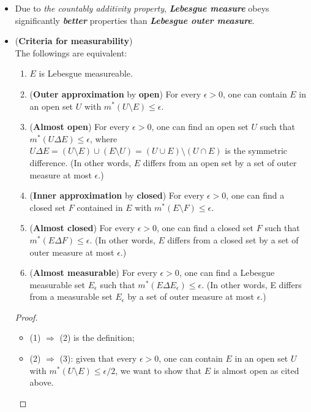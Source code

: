 \documentclass[11pt]{article}
\begin{document}
\begin{itemize}
\item \begin{remark}
Due to \emph{the countably additivity property}, \emph{\textbf{Lebesgue measure}} obeys significantly \emph{\textbf{better}} properties than \emph{\textbf{Lebesgue outer measure}}.
\end{remark}

\item \begin{proposition} (\textbf{Criteria for measurability})  \citep{tao2011introduction} \\
The followings are equivalent:
\begin{enumerate}
\item $E$ is Lebesgue measureable.
\item (\textbf{Outer approximation} by \textbf{open}) For every $\epsilon>0$, one can contain $E$ in an open set $U$ with $m^{*}(U \setminus  E)\le \epsilon $.
\item (\textbf{Almost open}) For every $\epsilon>0$, one can find an open set $U$ such that  $m^{*}(U\Delta E)\le \epsilon $, where $U\Delta E = (U  \setminus  E)\cup (E  \setminus  U) = (U\cup E) \setminus  (U\cap E)$ is the symmetric difference. (In other words, $E$ differs from an open set by a set of outer measure at most $\epsilon$.)
\item (\textbf{Inner approximation} by \textbf{closed}) For every $\epsilon>0$, one can find a closed set $F$ contained in $E$ with $m^{*}(E  \setminus  F)\le \epsilon $.
\item (\textbf{Almost closed}) For every $\epsilon>0$, one can find a closed set $F$ such that $m^{*}(E\Delta F)\le \epsilon $. (In other words, $E$ differs from a closed set by a set of outer measure at most $\epsilon$.)
\item (\textbf{Almost measurable}) For every $\epsilon>0$, one can find a Lebesgue measurable set $E_{\epsilon}$ such that $m^{*}(E\Delta E_{\epsilon})\le \epsilon $. (In other words, E differs from a measurable set $E_{\epsilon}$ by a set of outer measure at most $\epsilon$.)
\end{enumerate}
\end{proposition}
\begin{proof}
\begin{itemize}
\item (1) $\Rightarrow$ (2) is the definition;  
\item (2) $\Rightarrow$ (3): given that every $\epsilon>0$, one can contain $E$ in an open set $U$ with $m^{*}(U  \setminus  E)\le \epsilon/2 $, we want to show that $E$ is almost open as cited above. 


\end{itemize}
\end{proof}
\end{itemize}
\end{document}
